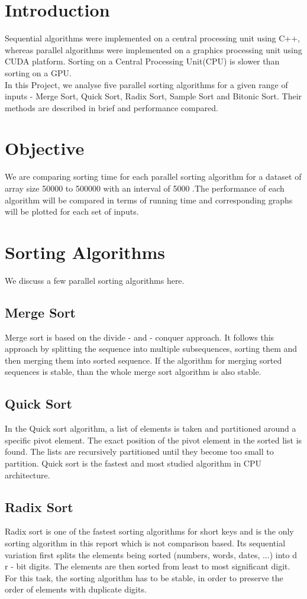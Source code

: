 \documentclass[journal]{IEEEtran}
\begin{document}
\section{Introduction}
Sequential algorithms were implemented on a central processing unit using C++, whereas parallel algorithms were implemented on a graphics processing unit using CUDA platform. Sorting on a Central Processing Unit(CPU) is slower than sorting on a GPU.\\ 
In this Project, we analyse five parallel sorting algorithms for a given range of inputs - Merge Sort, Quick Sort, Radix Sort, Sample Sort and Bitonic Sort. Their methods are described in brief and performance compared.

\section{Objective}
We are comparing sorting time for each parallel sorting algorithm for a dataset of array size 50000 to 500000 with an interval of 5000 .The performance of each algorithm will be compared in terms of running time and corresponding graphs will be plotted for each set of inputs. 

\section{Sorting Algorithms}
We discuss a few parallel sorting algorithms here.
\subsection{Merge Sort}
Merge sort is based on the divide - and - conquer approach. It follows this approach by splitting the sequence into multiple subsequences, sorting them and then merging them into sorted sequence. If the algorithm for merging sorted sequences is stable, than the whole merge sort algorithm is also stable.

\subsection{Quick Sort}
In the Quick sort algorithm, a list of elements is taken and partitioned around a specific pivot element. The exact position of the pivot element in the sorted list is found. The lists are recursively partitioned until they become too small to partition. Quick sort is the fastest and most studied algorithm in CPU architecture.

\subsection{Radix Sort}
Radix sort is one of the fastest sorting algorithms for short keys and is the only sorting algorithm in this report which is not comparison based. Its sequential variation first splits the elements being sorted (numbers, words, dates, ...) into d r - bit digits. The elements are then sorted from least to most significant digit. For this task, the sorting algorithm has to be stable, in order to preserve the order of elements with duplicate digits.
\end{document}
